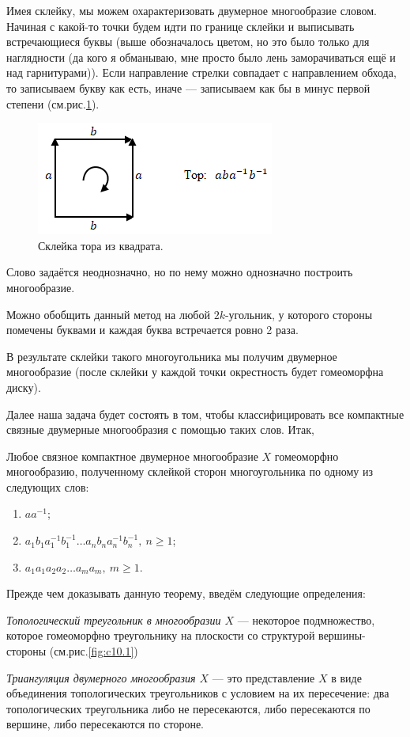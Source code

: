 Имея склейку, мы можем охарактеризовать двумерное многообразие словом. Начиная с какой-то точки будем идти по границе склейки и выписывать встречающиеся буквы (выше обозначалось цветом, но это было только для наглядности (да кого я обманываю, мне просто было лень заморачиваться ещё и над гарнитурами)). Если направление стрелки совпадает с направлением обхода, то записываем букву как есть, иначе — записываем как бы в минус первой степени (см.рис.\ref{fig:c10.2}).

\begin{figure}[H]
    \centering
    \includegraphics[scale=1]{images/c10.2.png}
    \caption{Склейка тора из квадрата.}
    \label{fig:c10.2}
\end{figure}

Слово задаётся неоднозначно, но по нему можно однозначно построить многообразие.

Можно обобщить данный метод на любой $2k$-угольник, у которого стороны помечены буквами и каждая буква встречается ровно 2 раза.

В результате склейки такого многоугольника мы получим двумерное многообразие (после склейки у каждой точки окрестность будет гомеоморфна диску).

Далее наша задача будет состоять в том, чтобы классифицировать все компактные связные двумерные многообразия с помощью таких слов. Итак,

\begin{theorem}
    Любое связное компактное двумерное многообразие $X$ гомеоморфно многообразию, полученному склейкой сторон многоугольника по одному из следующих слов:
    \begin{enumerate}
        \item $aa^{-1}$;
        \item $a_1b_1a_1^{-1}b_1^{-1}\dots a_n b_n a_n^{-1} b_n^{-1}, \ n \geqslant 1$;
        \item $a_1 a_1 a_2 a_2 \dots a_m a_m, \ m \geqslant 1$.
    \end{enumerate}
\end{theorem} 
Прежде чем доказывать данную теорему, введём следующие определения:
\begin{definition}
    \textit{Топологический треугольник в многообразии $X$} — некоторое подмножество, которое гомеоморфно треугольнику на плоскости со структурой вершины-стороны (см.рис.\ref{fig:c10.1})
\end{definition} 
\begin{definition}
    \textit{Триангуляция двумерного многообразия $X$} — это представление $X$ в виде объединения топологических треугольников с условием на их пересечение: два топологических треугольника либо не пересекаются, либо пересекаются по вершине, либо пересекаются по стороне.
\end{definition} 

